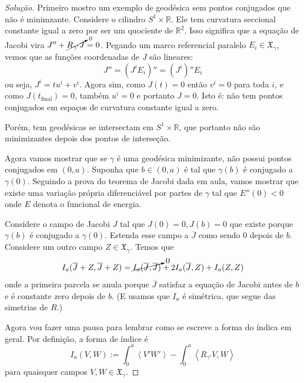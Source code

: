 \begin{proof}[Solução]\leavevmode
Primeiro mostro um exemplo de geodésica sem pontos conjugados que não é minimzante. Considere o cilindro \(S^1 \times \mathbb{R}\). Ele tem curvatura seccional constante igual a zero por ser um quociente de \(\mathbb{R}^2\). Isso significa que a equação de Jacobi vira \(J''+ \cancelto{0}{R_{\gamma'}J}=0\). Pegando um marco referencial paralelo \(E_i \in \mathfrak{X}_\gamma\), vemos que as funções coordenadas de \(J\) são lineares:
\[J''=(J^iE_i)''=(J^i)''E_i\]
ou seja, \(J^i=tu^i+v^i\). Agora sim, como \(J(t)=0\) então \(v^i=0\) para toda \(i\), e como \(J(t_{\operatorname{final}})=0\), também \(u^i=0\) e portanto \(J=0\). Isto é: não tem pontos conjugados em espaços de curvatura constante igual a zero.

Porém, tem geodésicas se intersectam em \(S^1\times \mathbb{R}\), que portanto não são minimizantes depois dos pontos de interseção.

\vspace{.5em}
Agora vamos mostrar que se \(\gamma\) é uma geodésica minimizante, não possui pontos conjugados em \((0,a)\). Suponha que \(b \in (0,a)\) é tal que \(\gamma(b)\) é conjugado a \(\gamma(0)\). Seguindo a prova do teorema de Jacobi dada em aula, vamos mostrar que existe uma variação própria diferenciável por partes de \(\gamma\) tal que \(E''(0)<0\) onde \(E\) denota o funcional de energia.

Considere o campo de Jacobi \(J\) tal que \(J(0)=0, J(b)=0\) que existe porque \(\gamma(b)\) é conjugado a \(\gamma(0)\). Estenda esse campo a \(\overline{J}\) como sendo 0 depois de \(b\). Considere um outro campo \(Z \in \mathfrak{X}_\gamma\). Temos que
\begin{equation}\label{eq:conju}I_a(\overline{J}+Z,\overline{J}+Z)=\cancelto{0}{I_a(\overline{J},\overline{J})}+2I_a(\overline{J},Z)+I_a(Z,Z)\end{equation}
onde a primeira parcela se anula porque \(\overline{J}\) satisfaz a equação de Jacobi antes de \(b\) e é constante zero depois de \(b\). (E usamos que \(I_a\) é simétrica, que segue das simetrias de \(R\).)

Agora vou fazer uma pausa para lembrar como se escreve a forma do índica em geral. Por definição, a forma de índice é
\[I_a(V,W):=\int_0^a \left<V'W'\right>-\int_0^a\left<R_{\gamma'}V,W\right>\]
para quaisquer campos \(V,W \in \mathfrak{X}_\gamma\).


\end{proof}
